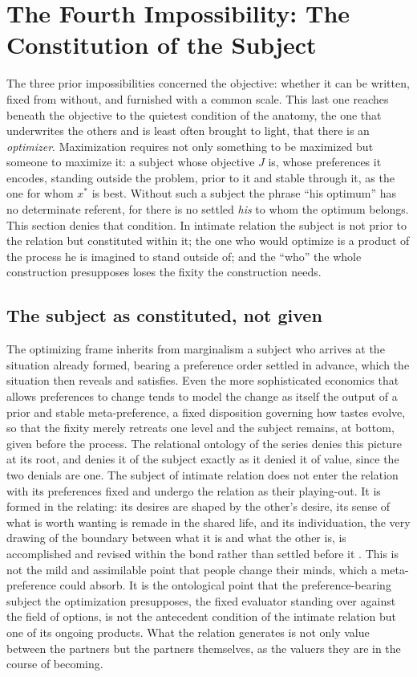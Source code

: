 \section{The Fourth Impossibility: The Constitution of the Subject}
\label{p25:sec:constitution}

\noindent
The three prior impossibilities concerned the objective: whether it can be written, fixed from without, and furnished with a common scale. This last one reaches beneath the objective to the quietest condition of the anatomy, the one that underwrites the others and is least often brought to light, that there is an \emph{optimizer}. Maximization requires not only something to be maximized but someone to maximize it: a subject whose objective $J$ is, whose preferences it encodes, standing outside the problem, prior to it and stable through it, as the one for whom $x^{\ast}$ is best. Without such a subject the phrase ``his optimum'' has no determinate referent, for there is no settled \emph{his} to whom the optimum belongs. This section denies that condition. In intimate relation the subject is not prior to the relation but constituted within it; the one who would optimize is a product of the process he is imagined to stand outside of; and the ``who'' the whole construction presupposes loses the fixity the construction needs.

\subsection*{The subject as constituted, not given}

The optimizing frame inherits from marginalism a subject who arrives at the situation already formed, bearing a preference order settled in advance, which the situation then reveals and satisfies. Even the more sophisticated economics that allows preferences to change tends to model the change as itself the output of a prior and stable meta-preference, a fixed disposition governing how tastes evolve, so that the fixity merely retreats one level and the subject remains, at bottom, given before the process. The relational ontology of the series denies this picture at its root, and denies it of the subject exactly as it denied it of value, since the two denials are one. The subject of intimate relation does not enter the relation with its preferences fixed and undergo the relation as their playing-out. It is formed in the relating: its desires are shaped by the other's desire, its sense of what is worth wanting is remade in the shared life, and its individuation, the very drawing of the boundary between what it is and what the other is, is accomplished and revised within the bond rather than settled before it \parencite{paperxxiv,paperxvii}. This is not the mild and assimilable point that people change their minds, which a meta-preference could absorb. It is the ontological point that the preference-bearing subject the optimization presupposes, the fixed evaluator standing over against the field of options, is not the antecedent condition of the intimate relation but one of its ongoing products. What the relation generates is not only value between the partners but the partners themselves, as the valuers they are in the course of becoming.

